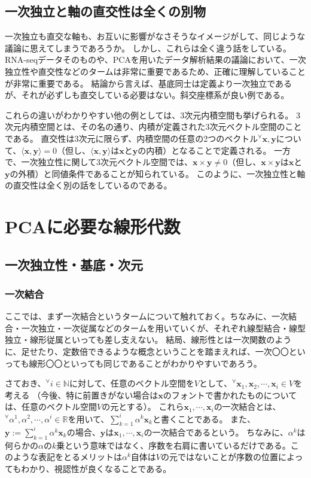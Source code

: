 \documentclass[10pt]{ujarticle}
\begin{document}
\subsection{一次独立と軸の直交性は全くの別物}
一次独立も直交な軸も、お互いに影響がなさそうなイメージがして、同じような議論に思えてしまうであろうか。
しかし、これらは全く違う話をしている。RNA-seqデータそのものや、PCAを用いたデータ解析結果の議論において、一次独立性や直交性などのタームは非常に重要であるため、正確に理解していることが非常に重要である。
結論から言えば、基底同士は定義より一次独立であるが、それが必ずしも直交している必要はない。斜交座標系が良い例である。

これらの違いがわかりやすい他の例としては、3次元内積空間も挙げられる。
3次元内積空間とは、その名の通り、内積が定義された3次元ベクトル空間のことである。
直交性は3次元に限らず、内積空間の任意の2つのベクトル$^\forall\mathbf{x,y}$について、$\langle\mathbf{x},\mathbf{y}\rangle=0$（但し、$\langle\mathbf{x},\mathbf{y}\rangle$は$\mathbf{x}$と$\mathbf{y}$の内積）となることで定義される。
一方で、一次独立性に関して3次元ベクトル空間では、$\mathbf{x}\times\mathbf{y}\neq0$（但し、$\mathbf{x}\times\mathbf{y}$は$\mathbf{x}$と$\mathbf{y}$の外積）と同値条件であることが知られている。
このように、一次独立性と軸の直交性は全く別の話をしているのである。

\section{PCAに必要な線形代数}

\hypertarget{bases_and_dim}{\subsection{一次独立性・基底・次元}}
\subsubsection{一次結合}
ここでは、まず一次結合というタームについて触れておく。ちなみに、一次結合・一次独立・一次従属などのタームを用いていくが、それぞれ線型結合・線型独立・線形従属といっても差し支えない。
結局、線形性とは一次関数のように、足せたり、定数倍できるような概念ということを踏まえれば、一次〇〇といっても線形〇〇といっても同じであることがわかりやすいであろう。

さておき、$^\forall i\in\mathbb{N}$に対して、任意のベクトル空間を$V$として、$^\forall\mathbf{x}_1,\mathbf{x}_2,\cdots,\mathbf{x}_i\in V$を考える
（今後、特に前置きがない場合は$\mathbf{x}$のフォントで書かれたものについては、任意のベクトル空間$V$の元とする）。
これら$\mathbf{x}_1,\cdots,\mathbf{x}_i$の一次結合とは、$^\forall\alpha^1,\alpha^2,\cdots,\alpha^i\in\mathbb{R}$を用いて、$\sum_{k=1}^{i}\alpha^k\mathbf{x}_k$と書くことである。
また、$\mathbf{y}:=\sum_{k=1}^{i}\alpha^k\mathbf{x}_k$の場合、$\mathbf{y}$は$\mathbf{x}_1,\cdots,\mathbf{x}_i$の一次結合であるという。
ちなみに、$\alpha^k$は何らかの$\alpha$の$k$乗という意味ではなく、序数を右肩に書いているだけである。このような表記をとるメリットは$\alpha^{k}$自体は$V$の元ではないことが序数の位置によってもわかり、視認性が良くなることである。
\end{document}
